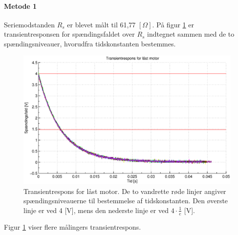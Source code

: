 \paragraph{Metode 1\\}
Seriemodstanden \(R_s\) er blevet målt til 61,77 \([\Omega]\).
På figur \ref{fig:induktans0} er transientresponsen for spændingsfaldet over \(R_s\) indtegnet
sammen med de to spændingsniveauer, hvorudfra tidskonstanten bestemmes.
\begin{figure}[th!]
	\centering
	\includegraphics[width=1\textwidth]{./graphics/induktans0.eps}
	\caption[Transientrespons for låst motor]
		{Transientrespons for låst motor. De to vandrette røde linjer angiver spændingsniveauerne til bestemmelse af tidskonstanten.
		Den øverste linje er ved 4 [V], mens den nederste linje er ved \(4\cdot \frac{1}{e}\)  [V].}
	\label{fig:induktans0}
\end{figure}
Figur \ref{fig:induktans0} viser flere målingers transientrespons.

